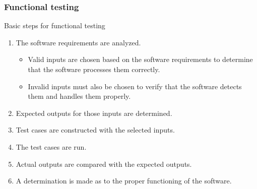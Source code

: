 \begin{frame}[hasprev=true, hasnext=false]
\frametitle{Functional testing}

\begin{block:procedure}{Basic steps for functional testing}
\begin{enumerate}
	\item The software requirements are analyzed.
	\begin{itemize}
		\item Valid inputs are chosen based on the software requirements
		to determine that the software processes them correctly.

		\item Invalid inputs must also be chosen to verify that the software
		detects them and handles them properly.
	\end{itemize}

	\item Expected outputs for those inputs are determined.

	\item Test cases are constructed with the selected inputs.

	\item The test cases are run.

	\item Actual outputs are compared with the expected outputs.

	\item A determination is made as to the proper functioning of the software.
\end{enumerate}
\end{block:procedure}
\end{frame}
